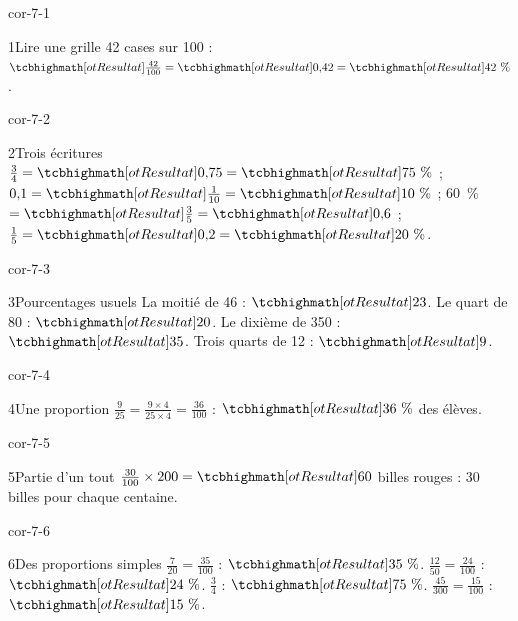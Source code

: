 \clearpage\pagestyle{otMain}\setlength{\otBlocEspacement}{2.5mm}\fontsize{11}{15}\selectfont{}
\begin{blocLivre}{cor-7-1}\begin{corrige}{1}{Lire une grille}
42 cases sur 100 : $\res{\frac{42}{100}}=\res{0{,}42}=\res{42\text{~\%}}$.
\label{fig-cor-7-1}
\end{corrige}\end{blocLivre}
\begin{blocLivre}{cor-7-2}\begin{corrige}{2}{Trois écritures}
$\frac34=\res{0{,}75}=\res{75\text{~\%}}$ ; $0{,}1=\res{\frac1{10}}=\res{10\text{~\%}}$ ; 60~\% $=\res{\frac35}=\res{0{,}6}$ ; $\frac15=\res{0{,}2}=\res{20\text{~\%}}$.
\end{corrige}\end{blocLivre}
\begin{blocLivre}{cor-7-3}\begin{corrige}{3}{Pourcentages usuels}
La moitié de 46 : $\res{23}$. Le quart de 80 : $\res{20}$. Le dixième de 350 : $\res{35}$. Trois quarts de 12 : $\res9$.
\end{corrige}\end{blocLivre}
\begin{blocLivre}{cor-7-4}\begin{corrige}{4}{Une proportion}
$\frac9{25}=\frac{9\times4}{25\times4}=\frac{36}{100}$ : $\res{36\text{~\%}}$ des élèves.
\end{corrige}\end{blocLivre}
\begin{blocLivre}{cor-7-5}\begin{corrige}{5}{Partie d’un tout}
$\frac{30}{100}\times200=\res{60}$ billes rouges : 30 billes pour chaque centaine.
\end{corrige}\end{blocLivre}
\begin{blocLivre}{cor-7-6}\begin{corrige}{6}{Des proportions simples}
$\frac7{20}=\frac{35}{100}$ : $\res{35\text{~\%}}$. $\frac{12}{50}=\frac{24}{100}$ : $\res{24\text{~\%}}$. $\frac34$ : $\res{75\text{~\%}}$. $\frac{45}{300}=\frac{15}{100}$ : $\res{15\text{~\%}}$.
\end{corrige}\end{blocLivre}
